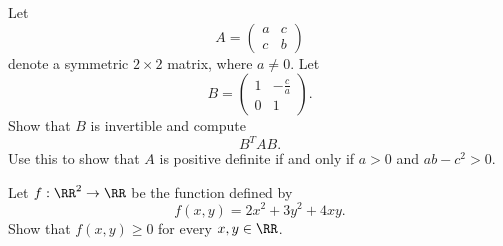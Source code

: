 \documentclass{article}
\begin{document}
Let
$$
A =
\begin{pmatrix}
  a & c\\
  c & b
\end{pmatrix}
$$
denote a symmetric $2\times 2$ matrix, where $a\neq 0$. Let
$$
B =
\begin{pmatrix}
  1 & -\frac{c}{a}\\
  0 & 1
\end{pmatrix}.
$$
Show that $B$ is invertible and compute
$$
B^T A B.
$$
Use this to show that $A$ is positive definite if and only if
$a>0$ and $a b - c^2 > 0$.

Let $f:\RR^2\rightarrow \RR$ be the function defined by
$$
f(x, y) = 2 x^2 + 3 y^2 + 4 x y.
$$
Show that $f(x, y)\geq 0$ for every $x, y\in \RR$.
\endshex
\end{document}
